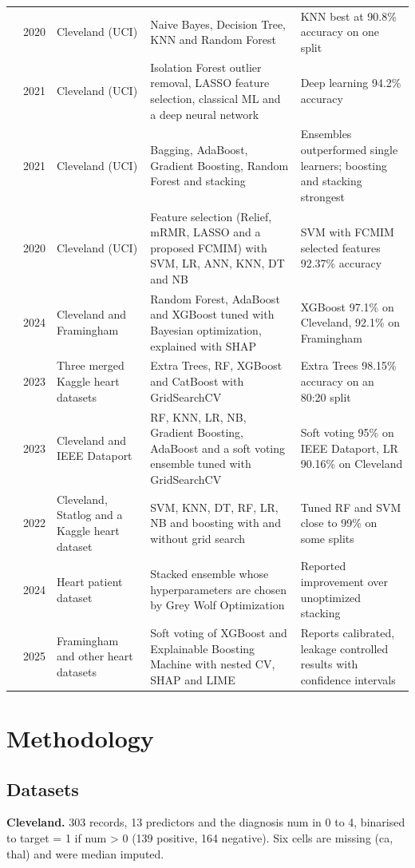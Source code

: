 \documentclass[runningheads]{llncs}
\begin{document}
\begin{table}[htbp]
\begin{tabular}
{}\cite{r12} & 2020 & Cleveland (UCI) & Naive Bayes, Decision Tree, KNN and Random Forest & KNN best at 90.8\% accuracy on one split \\
{}\cite{r13} & 2021 & Cleveland (UCI) & Isolation Forest outlier removal, LASSO feature selection, classical ML and a deep neural network & Deep learning 94.2\% accuracy \\
{}\cite{r14} & 2021 & Cleveland (UCI) & Bagging, AdaBoost, Gradient Boosting, Random Forest and stacking & Ensembles outperformed single learners; boosting and stacking strongest \\
{}\cite{r15} & 2020 & Cleveland (UCI) & Feature selection (Relief, mRMR, LASSO and a proposed FCMIM) with SVM, LR, ANN, KNN, DT and NB & SVM with FCMIM selected features 92.37\% accuracy \\
{}\cite{r16} & 2024 & Cleveland and Framingham & Random Forest, AdaBoost and XGBoost tuned with Bayesian optimization, explained with SHAP & XGBoost 97.1\% on Cleveland, 92.1\% on Framingham \\
{}\cite{r17} & 2023 & Three merged Kaggle heart datasets & Extra Trees, RF, XGBoost and CatBoost with GridSearchCV & Extra Trees 98.15\% accuracy on an 80:20 split \\
{}\cite{r18} & 2023 & Cleveland and IEEE Dataport & RF, KNN, LR, NB, Gradient Boosting, AdaBoost and a soft voting ensemble tuned with GridSearchCV & Soft voting 95\% on IEEE Dataport, LR 90.16\% on Cleveland \\
{}\cite{r19} & 2022 & Cleveland, Statlog and a Kaggle heart dataset & SVM, KNN, DT, RF, LR, NB and boosting with and without grid search & Tuned RF and SVM close to 99\% on some splits \\
{}\cite{r20} & 2024 & Heart patient dataset & Stacked ensemble whose hyperparameters are chosen by Grey Wolf Optimization & Reported improvement over unoptimized stacking \\
{}\cite{r21} & 2025 & Framingham and other heart datasets & Soft voting of XGBoost and Explainable Boosting Machine with nested CV, SHAP and LIME & Reports calibrated, leakage controlled results with confidence intervals \\
\hline
\end{tabular}
\end{table}

\section{Methodology}
\subsection{Datasets}
\textbf{Cleveland.} 303 records, 13 predictors and the diagnosis num in 0 to 4, binarised to target = 1 if num \textgreater{} 0 (139 positive, 164 negative). Six cells are missing (ca, thal) and were median imputed.
\end{document}
